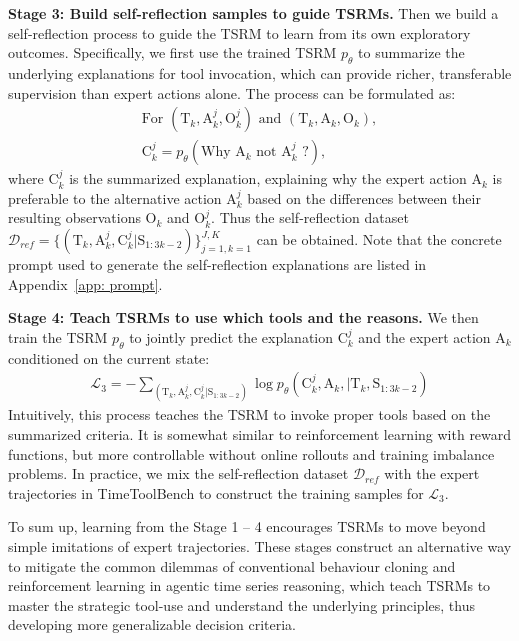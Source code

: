 \textbf{Stage 3: Build self-reflection samples to guide TSRMs.} Then we build a self-reflection process to guide the TSRM to learn from its own exploratory outcomes. Specifically, we first use the trained TSRM $p_\theta$ to summarize the underlying explanations for tool invocation, which can provide richer, transferable supervision than expert actions alone. The process can be formulated as:
\begin{gather} 
    \text{For }(\mathrm{T}_k, \mathrm{A}_k^j, \mathrm{O}_k^j) \text{ and } (\mathrm{T}_k, \mathrm{A}_k, \mathrm{O}_k),\\
    \mathrm{C}_k^j = p_\theta(\text{Why }\mathrm{A}_k \text{ not } \mathrm{A}^j_k \text{ ?}),
\end{gather}
where $\mathrm{C}_k^j$ is the summarized explanation, explaining why the expert action $\mathrm{A}_k$ is preferable to the alternative action $\mathrm{A}_k^j$ based on the differences between their resulting observations $\mathrm{O}_k$ and $\mathrm{O}_k^j$. Thus the self-reflection dataset $\mathcal{D}_{ref} = \{(\mathrm{T}_k, \mathrm{A}_k^j, \mathrm{C}_k^j | \mathrm{S}_{1:3k-2})\}_{j=1,k=1}^{J,K}$ can be obtained. Note that the concrete prompt used to generate the self-reflection explanations are listed in Appendix~\ref{app: prompt}. 

\textbf{Stage 4: Teach TSRMs to use which tools and the reasons.} We then train the TSRM $p_\theta$ to jointly predict the explanation $\mathrm{C}^j_k$ and the expert action $\mathrm{A}_k$ conditioned on the current state:
\begin{gather}
    \mathcal{L}_3 = -\displaystyle\sum_{(\mathrm{T}_k, \mathrm{A}_k^j, \mathrm{C}_k^j | \mathrm{S}_{1:3k-2})} \log p_\theta(\mathrm{C}^j_k, \mathrm{A}_k, | \mathrm{T}_k, \mathrm{S}_{1:3k-2})
\end{gather}
Intuitively, this process teaches the TSRM to invoke proper tools based on the summarized criteria. It is somewhat similar to reinforcement learning with reward functions, but more controllable without online rollouts and training imbalance problems. In practice, we mix the self-reflection dataset $\mathcal{D}_{ref}$ with the expert trajectories in  TimeToolBench to construct the training samples for $\mathcal{L}_3$.

To sum up, learning from the Stage 1 -- 4 encourages TSRMs to move beyond simple imitations of expert trajectories. These stages construct an alternative way to mitigate the common dilemmas of conventional behaviour cloning and reinforcement learning in agentic time series reasoning, which teach TSRMs to master the strategic tool-use and understand the underlying principles, thus developing more generalizable decision criteria.